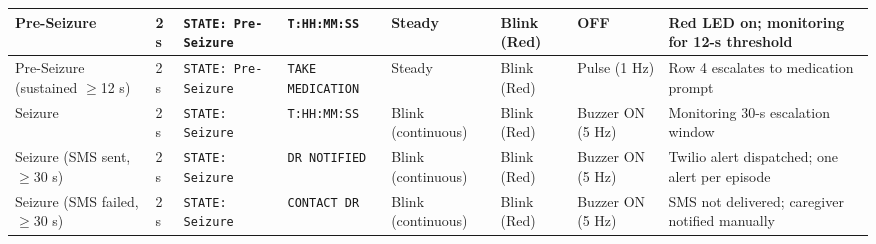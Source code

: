 \documentclass[12pt, a4paper]{report}
\begin{document}
\begin{landscape}
\begin{table}[H]
{\begin{tabular}{|p{2.6cm}|p{2.0cm}|p{3.2cm}|p{3.2cm}|p{3.0cm}|p{2.0cm}|p{2.0cm}|p{3.2cm}|}
\rowcolor{lightgray}
Pre-Seizure &
2 s &
\texttt{STATE: Pre-Seizure} &
\texttt{T:HH:MM:SS} &
Steady &
Blink (Red) &
OFF &
Red LED on; monitoring for 12-s threshold \\
\hline

Pre-Seizure (sustained $\geq$12 s) &
2 s &
\texttt{STATE: Pre-Seizure} &
\texttt{TAKE MEDICATION} &
Steady &
Blink (Red) &
Pulse (1 Hz) &
Row 4 escalates to medication prompt \\
\hline

\rowcolor{lightgray}
Seizure &
2 s &
\texttt{STATE: Seizure} &
\texttt{T:HH:MM:SS} &
Blink (continuous) &
Blink (Red) &
Buzzer ON (5 Hz) &
Monitoring 30-s escalation window \\
\hline

Seizure (SMS sent, $\geq$30 s) &
2 s &
\texttt{STATE: Seizure} &
\texttt{DR NOTIFIED} &
Blink (continuous) &
Blink (Red) &
Buzzer ON (5 Hz) &
Twilio alert dispatched; one alert per episode \\
\hline

\rowcolor{lightgray}
Seizure (SMS failed, $\geq$30 s) &
2 s &
\texttt{STATE: Seizure} &
\texttt{CONTACT DR} &
Blink (continuous) &
Blink (Red) &
Buzzer ON (5 Hz) &
SMS not delivered; caregiver notified manually \\
\hline

\end{tabular}
}
\end{table}
\end{landscape}
\end{document}
